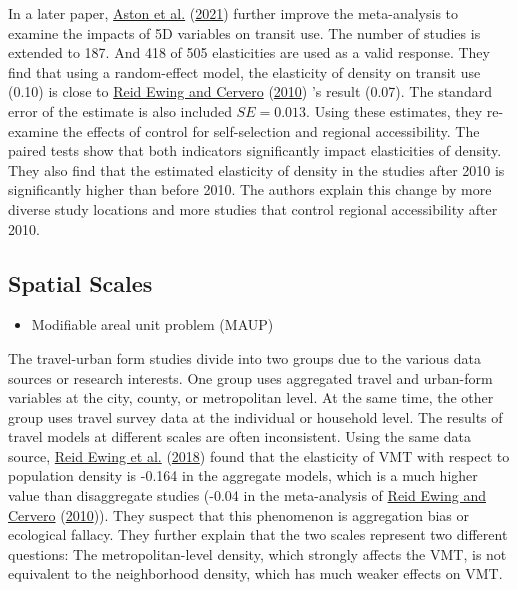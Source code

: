 \documentclass[
  12pt,
]{article}
\providecommand{\tightlist}{%
  \setlength{\itemsep}{0pt}\setlength{\parskip}{0pt}}
\begin{document}
In a later paper, \protect\hyperlink{ref-astonExploringBuiltEnvironment2021}{Aston et al.} (\protect\hyperlink{ref-astonExploringBuiltEnvironment2021}{2021}) further improve the meta-analysis to examine the impacts of 5D variables on transit use. The number of studies is extended to 187. And 418 of 505 elasticities are used as a valid response. They find that using a random-effect model, the elasticity of density on transit use (0.10) is close to \protect\hyperlink{ref-ewingTravelBuiltEnvironment2010}{Reid Ewing and Cervero} (\protect\hyperlink{ref-ewingTravelBuiltEnvironment2010}{2010}) 's result (0.07). The standard error of the estimate is also included \(SE=0.013\). Using these estimates, they re-examine the effects of control for self-selection and regional accessibility. The paired tests show that both indicators significantly impact elasticities of density. They also find that the estimated elasticity of density in the studies after 2010 is significantly higher than before 2010. The authors explain this change by more diverse study locations and more studies that control regional accessibility after 2010.

\hypertarget{scale}{%
\subsection{Spatial Scales}\label{scale}}

\begin{itemize}
\tightlist
\item
  Modifiable areal unit problem (MAUP)
\end{itemize}

The travel-urban form studies divide into two groups due to the various data sources or research interests. One group uses aggregated travel and urban-form variables at the city, county, or metropolitan level. At the same time, the other group uses travel survey data at the individual or household level. The results of travel models at different scales are often inconsistent. Using the same data source, \protect\hyperlink{ref-ewingTestingNewmanKenworthy2018}{Reid Ewing et al.} (\protect\hyperlink{ref-ewingTestingNewmanKenworthy2018}{2018}) found that the elasticity of VMT with respect to population density is -0.164 in the aggregate models, which is a much higher value than disaggregate studies (-0.04 in the meta-analysis of \protect\hyperlink{ref-ewingTravelBuiltEnvironment2010}{Reid Ewing and Cervero} (\protect\hyperlink{ref-ewingTravelBuiltEnvironment2010}{2010})). They suspect that this phenomenon is aggregation bias or ecological fallacy. They further explain that the two scales represent two different questions: The metropolitan-level density, which strongly affects the VMT, is not equivalent to the neighborhood density, which has much weaker effects on VMT.
\end{document}

